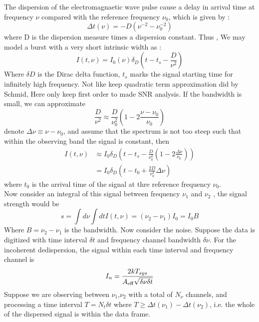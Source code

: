 \documentclass[iop]{emulateapj}
\begin{document}
The dispersion of the electromagnaetic wave pulse cause a delay in arrival time at frequency $\nu$ compared with the reference frequency $\nu_0$, which is given by :
\begin{equation}
\Delta t (\nu) = -D(\nu^{-2} -\nu^{-2}_{0})\label{eq:Disperse relation}
\end{equation}
where D is the dispersion measure times a dispersion constant. Thus , We may model a burst with a very short intrinsic width as :
\begin{equation}
I(t,\nu)=I_0(\nu)\delta_D(t-t_s -\frac{D}{\nu^2})  
\end{equation}
Where $\delta D$ is the Dirac delta function, $t_s$ marks the signal starting time for infinitely high frequency. Not like keep quadratic term  approximation did by Schmid, Here only keep first order to made SNR analysis.  If the bandwidth is small, we can approximate
\begin{equation*}
\frac{D}{\nu^{2}}\approx\frac{D}{\nu_0^2}(1-2\frac{\nu-\nu_0}{\nu_0})
\end{equation*}
denote $\Delta　\nu \equiv \nu - \nu_0$, and assume that the spectrum is not too steep such that within the observing band the signal is constant, then
\begin{equation}
\begin{aligned}
I(t,\nu) & \approx I_0\delta_D(t-t_s-\frac{D}{\nu_0^2}(1-2\frac{\Delta\nu}{\nu_0}) ) \\
		 & = I_0\delta_D(t -t_0 +\frac{2D}{\nu_0^3}\Delta\nu)
\end{aligned} 
\end{equation} \label{eq:linear assumpution}
where $t_0$ is the arrival time of the signal at thre reference frequency $\nu_0$. \\
	Now consider an integral of this signal between frequency $\nu_1 $ and $\nu_2$ , the signal strength would be
\begin{equation}
s = \int d \nu \int dtI(t,\nu)=(\nu_2 -\nu_1)I_0 = I_0B
\end{equation}
Where $B =\nu_2 -\nu_1$ is the bandwidth. Now consider the noise. Suppose the data is digitized with time interval $\delta t$ and frequency channel bandwidth $\delta \nu$. For the incoherent dedispersion, the signal within each time interval and frequency channel is 
\begin{equation}
I_n = \frac{2k T_{sys}}{A_{\rm eff} \sqrt{\delta \nu \delta t}} 
\end{equation}
Suppose we are observing between $\nu_1$,$\nu_2$ with a total of $N_\nu$ channels, and processing a time interval $T = N_t \delta t$ where $T \geq \Delta t(\nu_1) -\Delta t(\nu_2)$, i.e. the whole of the dispersed signal is within the data frame. \\
\end{document}
